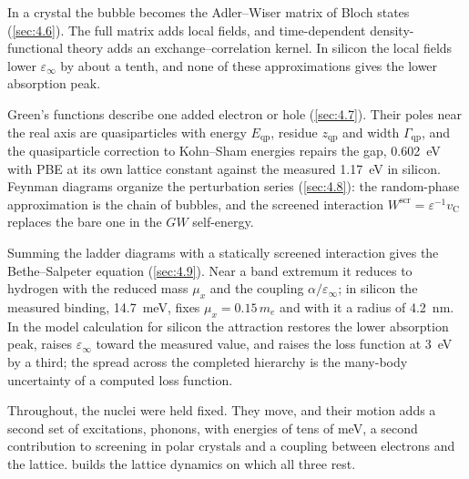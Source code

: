 In a crystal the bubble becomes the Adler--Wiser matrix of Bloch states (\cref{sec:4.6}). The full matrix adds local fields, and time-dependent density-functional theory adds an exchange--correlation kernel. In silicon the local fields lower $\varepsilon_\infty$ by about a tenth, and none of these approximations gives the lower absorption peak.

Green's functions describe one added electron or hole (\cref{sec:4.7}). Their poles near the real axis are quasiparticles with energy $E_{\mathrm{qp}}$, residue $z_{\mathrm{qp}}$ and width $\varGamma_{\mathrm{qp}}$, and the quasiparticle correction to Kohn--Sham energies repairs the gap, \SI{0.602}{eV} with PBE at its own lattice constant against the measured \SI{1.17}{eV} in silicon. Feynman diagrams organize the perturbation series (\cref{sec:4.8}): the random-phase approximation is the chain of bubbles, and the screened interaction $W^{\mathrm{scr}} = \varepsilon^{-1}v_{\mathrm{C}}$ replaces the bare one in the $GW$ self-energy.

Summing the ladder diagrams with a statically screened interaction gives the Bethe--Salpeter equation (\cref{sec:4.9}). Near a band extremum it reduces to hydrogen with the reduced mass $\mu_x$ and the coupling $\alpha/\varepsilon_\infty$; in silicon the measured binding, \SI{14.7}{meV}, fixes $\mu_x = 0.15\,m_e$ and with it a radius of \SI{4.2}{nm}. In the model calculation for silicon the attraction restores the lower absorption peak, raises $\varepsilon_\infty$ toward the measured value, and raises the loss function at \SI{3}{eV} by a third; the spread across the completed hierarchy is the many-body uncertainty of a computed loss function.

Throughout, the nuclei were held fixed. They move, and their motion adds a second set of excitations, phonons, with energies of tens of meV, a second contribution to screening in polar crystals and a coupling between electrons and the lattice.  builds the lattice dynamics on which all three rest.
